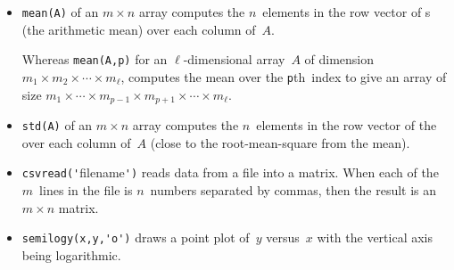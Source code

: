 \begin{table}
\begin{minipage}{\linewidth}
\begin{itemize}
\item {}\verb|mean(A)| of an \(m\times n\) array computes the \(n\)~elements in the row vector of s (the arithmetic mean) over each column of~\(A\).

Whereas \verb|mean(A,p)| for an \(\ell\)-dimensional array~\(A\) of dimension \(m_1\times m_2\times\cdots\times m_\ell\),  computes the mean over the \verb|p|th~index to give an array of size \(m_1\times\cdots\times m_{p-1}\times m_{p+1}\times\cdots\times m_\ell\).

\item {}\verb|std(A)| of an \(m\times n\) array computes the \(n\)~elements in the row vector of the  over each column of~\(A\) (close to the root-mean-square from the mean).

\item  {}\verb|csvread('|filename\verb|')| reads data from a file into a matrix.
When each of the \(m\)~lines in the file is \(n\)~numbers separated by commas, then the result is an \(m\times n\) matrix. 


\item {}\verb|semilogy(x,y,'o')| draws a point plot of~\(y\) versus~\(x\) with the vertical axis being logarithmic.





\end{itemize}
\end{minipage}
\end{table}
